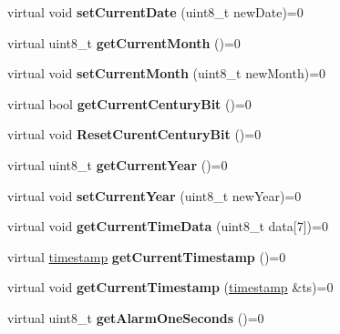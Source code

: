 \begin{DoxyCompactItemize}
virtual void {\bfseries set\+Current\+Date} (uint8\+\_\+t new\+Date)=0
\item 
\mbox{\label{classreal_time_clock_a24dd15babb345129fd995641946c5f2b}} 
virtual uint8\+\_\+t {\bfseries get\+Current\+Month} ()=0
\item 
\mbox{\label{classreal_time_clock_a2edeb084630a78309bc574eceaf5d6ae}} 
virtual void {\bfseries set\+Current\+Month} (uint8\+\_\+t new\+Month)=0
\item 
\mbox{\label{classreal_time_clock_ae0b15649f9135be8f0d9ada65084c28f}} 
virtual bool {\bfseries get\+Current\+Century\+Bit} ()=0
\item 
\mbox{\label{classreal_time_clock_a50e19a6b0aef44719e91e3e753da0dce}} 
virtual void {\bfseries Reset\+Curent\+Century\+Bit} ()=0
\item 
\mbox{\label{classreal_time_clock_a0cb99c34e2d6a089a62c8bea760c5add}} 
virtual uint8\+\_\+t {\bfseries get\+Current\+Year} ()=0
\item 
\mbox{\label{classreal_time_clock_a4d6e8056f52cea52bab5c635c0860c12}} 
virtual void {\bfseries set\+Current\+Year} (uint8\+\_\+t new\+Year)=0
\item 
\mbox{\label{classreal_time_clock_a2d1613b3cd572f62bc9faaea6a0f82f2}} 
virtual void {\bfseries get\+Current\+Time\+Data} (uint8\+\_\+t data\mbox{[}7\mbox{]})=0
\item 
\mbox{\label{classreal_time_clock_a08a7854ef9cef638996a267a953c9b14}} 
virtual \mbox{\hyperlink{classtimestamp}{timestamp}} {\bfseries get\+Current\+Timestamp} ()=0
\item 
\mbox{\label{classreal_time_clock_aa7402c5941b089d4e86b2af20d48b7ba}} 
virtual void {\bfseries get\+Current\+Timestamp} (\mbox{\hyperlink{classtimestamp}{timestamp}} \&ts)=0
\item 
\mbox{\label{classreal_time_clock_af4ff1775432a08af7e41db135d16bf65}} 
virtual uint8\+\_\+t {\bfseries get\+Alarm\+One\+Seconds} ()=0

\end{DoxyCompactItemize}
